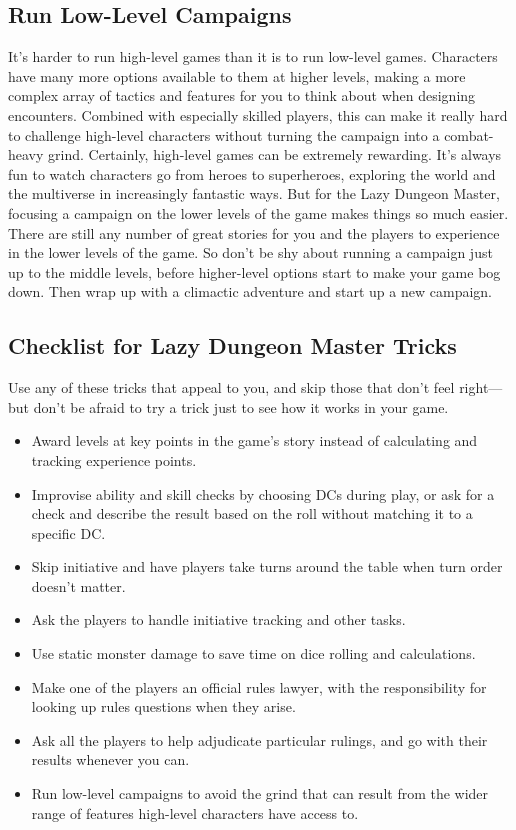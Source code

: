\documentclass[10pt,a4paper,twoside,bg=print,twocolumn,openany,nodeprecatedcode]{dndbook}
\begin{document}
\subsection{Run Low-Level Campaigns}
It's harder to run high-level games than it is to run low-level games. Characters have many more options available to them at higher levels, making a more complex array of tactics and features for you to think about when designing encounters. Combined with especially skilled players, this can make it really hard to challenge high-level characters without turning the campaign into a combat-heavy grind.
Certainly, high-level games can be extremely rewarding. It's always fun to watch characters go from heroes to superheroes, exploring the world and the multiverse in increasingly fantastic ways. But for the Lazy Dungeon Master, focusing a campaign on the lower levels of the game makes things so much easier. There are still any number of great stories for you and the players to experience in the lower levels of the game. So don't be shy about running a campaign just up to the middle levels, before higher-level options start to make your game bog down. Then wrap up with a climactic adventure and start up a new campaign.
\subsection{Checklist for Lazy Dungeon Master Tricks}
Use any of these tricks that appeal to you, and skip those that don't feel right—but don't be afraid to try a trick just to see how it works in your game.

\begin{itemize}
\item Award levels at key points in the game's story instead of calculating and tracking experience points.
\item Improvise ability and skill checks by choosing DCs during play, or ask for a check and describe the result based on the roll without matching it to a specific DC.
\item Skip initiative and have players take turns around the table when turn order doesn't matter.
\item Ask the players to handle initiative tracking and other tasks.
\item Use static monster damage to save time on dice rolling and calculations.
\item Make one of the players an official rules lawyer, with the responsibility for looking up rules questions when they arise.
\item Ask all the players to help adjudicate particular rulings, and go with their results whenever you can.
\item Run low-level campaigns to avoid the grind that can result from the wider range of features high-level characters have access to.
\end{itemize}
\end{document}
